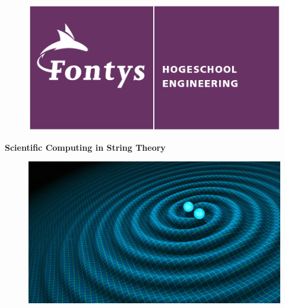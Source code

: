 \documentclass[../paper.tex]{subfiles}
\begin{document}
	\begin{titlepage}
	
		\begin{figure}[t]
		\begin{center} 
			\includegraphics[scale = 0.7]{fontys.png} %
			\label{default}
			
		\end{center}
	\end{figure}


		\begin{center}
			\Huge{\bfseries Scientific Computing in String Theory} %
		\end{center}



\begin{minipage}{0.75\linewidth}

    \begin{figure}[H]
    \centering
    \includegraphics[scale = 0.21]{frontimage.jpg}
    \end{figure}
  \end{minipage}
  
  \vfill
  

\end{titlepage}
\end{document}

